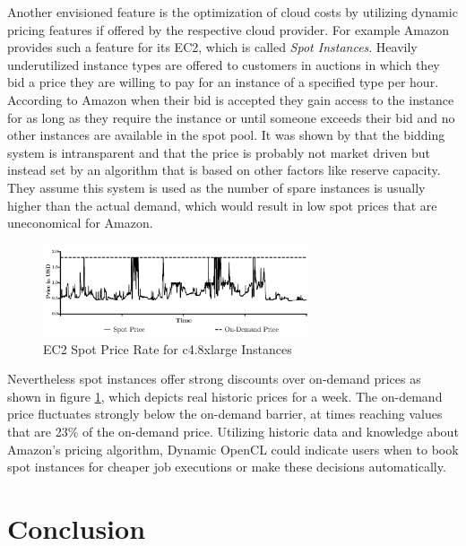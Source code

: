 Another envisioned feature is the optimization of cloud costs by utilizing dynamic pricing features if offered by the respective cloud provider. For example Amazon provides such a feature for its EC2, which is called \textit{Spot Instances}. Heavily underutilized instance types are offered to customers in auctions in which they bid a price they are willing to pay for an instance of a specified type per hour. According to Amazon when their bid is accepted they gain access to the instance for as long as they require the instance or until someone exceeds their bid and no other instances are available in the spot pool\cite{spot_instances}. It was shown by \citeauthor{spot_instance_pricing} that the bidding system is intransparent and that the price is probably not market driven but instead set by an algorithm that is based on other factors like reserve capacity\cite{spot_instance_pricing}. They assume this system is used as the number of spare instances is usually higher than the actual demand, which would result in low spot prices that are uneconomical for Amazon. 
\begin{figure}[!htb]	
	\includegraphics[width=0.7\textwidth]{images/ec2_spot_prices.pdf}
	\centering
	\caption{EC2 Spot Price Rate for c4.8xlarge Instances}
	\label{img:spot_pricing}
\end{figure}
Nevertheless spot instances offer strong discounts over on-demand prices as shown in figure \ref{img:spot_pricing}, which depicts real historic prices for a week. The on-demand price fluctuates strongly below the on-demand barrier, at times reaching values that are 23\% of the on-demand price. Utilizing historic data and knowledge about Amazon's pricing algorithm, Dynamic OpenCL could indicate users when to book spot instances for cheaper job executions or make these decisions automatically.

\chapter{Conclusion}

